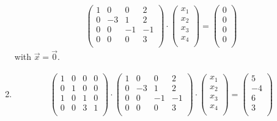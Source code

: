 \documentclass{article}
\begin{document}
\begin{enumerate}
\begin{align*}
\begin{pmatrix}
            1 & 0 & 0 & 2 \\
            0 & -3 & 1 & 2 \\
            0 & 0 & -1 & -1 \\
            0 & 0 & 0 & 3 \\
        \end{pmatrix} \cdot \begin{pmatrix}
            x_1 \\ x_2 \\ x_3 \\ x_4 \\
        \end{pmatrix}
        =
        \begin{pmatrix}
            0 \\ 0 \\ 0 \\ 0 \\ 
        \end{pmatrix}
    \end{align*}
    with $\vec{x} = \vec{0}$.

    \item \begin{align*}
        \begin{pmatrix}
            1 & 0 & 0 & 0 \\
            0 & 1 & 0 & 0 \\
            1 & 0 & 1 & 0 \\
            0 & 0 & 3 & 1 \\
        \end{pmatrix} \cdot 
        \begin{pmatrix}
            1 & 0 & 0 & 2 \\
            0 & -3 & 1 & 2 \\
            0 & 0 & -1 & -1 \\
            0 & 0 & 0 & 3 \\
        \end{pmatrix} \cdot \begin{pmatrix}
            x_1 \\ x_2 \\ x_3 \\ x_4 \\
        \end{pmatrix} =
        \begin{pmatrix}
            5 \\ -4 \\ 6 \\ 3 \\ 
        \end{pmatrix}
    \end{align*}


\end{enumerate}
\end{document}
